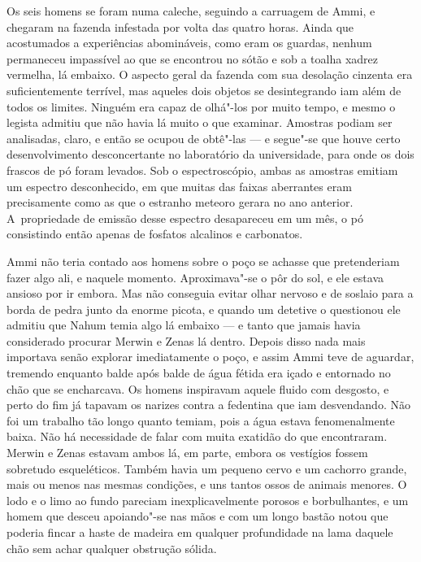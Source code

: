 Os seis homens se foram numa caleche, seguindo a carruagem de Ammi, e
chegaram na fazenda infestada por volta das quatro horas. Ainda que
acostumados a experiências abomináveis, como eram os guardas, nenhum
permaneceu impassível ao que se encontrou no sótão e sob a toalha xadrez
vermelha, lá embaixo. O aspecto geral da fazenda com sua desolação
cinzenta era suficientemente terrível, mas aqueles dois objetos se
desintegrando iam além de todos os limites. Ninguém era capaz de
olhá"-los por muito tempo, e mesmo o legista admitiu que não havia lá
muito o que examinar. Amostras podiam ser analisadas, claro, e então se
ocupou de obtê"-las --- e segue"-se
que houve certo desenvolvimento desconcertante no laboratório da
universidade, para onde os dois frascos de pó foram levados. Sob o
espectroscópio, ambas as amostras emitiam um espectro desconhecido, em
que muitas das faixas aberrantes eram precisamente como as que o
estranho meteoro gerara no ano anterior. A~propriedade de emissão desse
espectro desapareceu em um mês, o pó consistindo então apenas de
fosfatos alcalinos e carbonatos.

Ammi não teria contado aos homens sobre o poço se achasse que
pretenderiam fazer algo ali, e naquele momento. Aproximava"-se o
pôr do sol, e ele estava ansioso por ir embora. Mas não conseguia evitar
olhar nervoso e de soslaio para a borda de pedra junto da enorme picota,
e quando um detetive o questionou ele admitiu que Nahum temia algo lá
embaixo --- e tanto que jamais
havia considerado procurar Merwin e Zenas lá dentro. Depois disso nada
mais importava senão explorar imediatamente o poço, e assim Ammi teve de
aguardar, tremendo enquanto balde após balde de água fétida era içado e
entornado no chão que se encharcava. Os homens inspiravam aquele fluido
com desgosto, e perto do fim já tapavam os narizes contra a fedentina
que iam desvendando. Não foi um trabalho tão longo quanto temiam, pois a
água estava fenomenalmente baixa. Não há necessidade de falar com muita
exatidão do que encontraram. Merwin e Zenas estavam ambos lá, em parte,
embora os vestígios fossem sobretudo esqueléticos. Também havia um
pequeno cervo e um cachorro grande, mais ou menos nas mesmas condições,
e uns tantos ossos de animais menores. O lodo e o limo ao fundo pareciam
inexplicavelmente porosos e borbulhantes, e um homem que desceu
apoiando"-se nas mãos e com um longo bastão notou que poderia fincar a
haste de madeira em qualquer profundidade na lama daquele chão sem achar
qualquer obstrução sólida.

